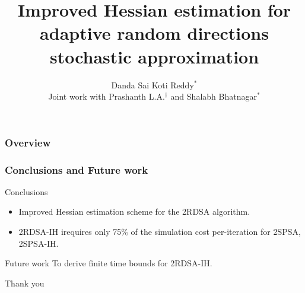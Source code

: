 \documentclass{beamer}
\title[Stochastic optimization]{Improved Hessian estimation for adaptive random directions stochastic approximation} %
\author{ Danda Sai Koti Reddy$^*$\\[1.5ex]
{\footnotesize Joint work with Prashanth L.A.$^\dagger$ and Shalabh Bhatnagar$^*$}
} %
\institute %
{
$*$ Indian Institute of Science, Bangalore\\
$\dagger$ University of Maryland, College Park
}
\date{} %
\begin{document}
\begin{frame}
\titlepage 
\end{frame}

\begin{frame}
\frametitle{Overview}
\tableofcontents
\end{frame}



%



\begin{frame}
\frametitle{\centering  Conclusions and Future work}
\begin{block}{Conclusions}
\begin{itemize}
\item Improved Hessian estimation scheme for the 2RDSA algorithm.
\item  2RDSA-IH irequires only 75\% of the simulation cost per-iteration for 2SPSA, 2SPSA-IH.
\end{itemize}
\end{block}
\begin{block}{Future work}
To derive finite time bounds for 2RDSA-IH.
\end{block}

\end{frame}



%
%


\begin{frame}

\begin{block}{}
\begin{center}
{\Huge Thank you}
\end{center}
\end{block}
\end{frame}
\end{document}
